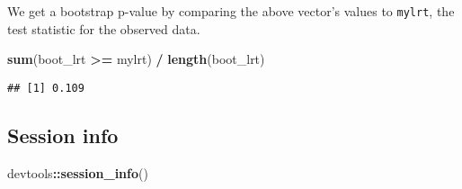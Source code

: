 \documentclass{book}
\newenvironment{Shaded}{\begin{snugshade}}{\end{snugshade}}
\newcommand{\KeywordTok}[1]{\textcolor[rgb]{0.13,0.29,0.53}{\textbf{#1}}}
\newcommand{\NormalTok}[1]{#1}
\newcommand{\OperatorTok}[1]{\textcolor[rgb]{0.81,0.36,0.00}{\textbf{#1}}}
\newcommand{\StringTok}[1]{\textcolor[rgb]{0.31,0.60,0.02}{#1}}
\begin{document}
We get a bootstrap p-value by comparing the above vector's values to
\texttt{mylrt}, the test statistic for the observed data.

\begin{Shaded}
\begin{Highlighting}[]
\KeywordTok{sum}\NormalTok{(boot_lrt }\OperatorTok{>=}\StringTok{ }\NormalTok{mylrt) }\OperatorTok{/}\StringTok{ }\KeywordTok{length}\NormalTok{(boot_lrt)}
\end{Highlighting}
\end{Shaded}

\begin{verbatim}
## [1] 0.109
\end{verbatim}

\hypertarget{session-info}{%
\subsection{Session info}\label{session-info}}

\begin{Shaded}
\begin{Highlighting}[]
\NormalTok{devtools}\OperatorTok{::}\KeywordTok{session_info}\NormalTok{()}
\end{Highlighting}
\end{Shaded}
\end{document}

